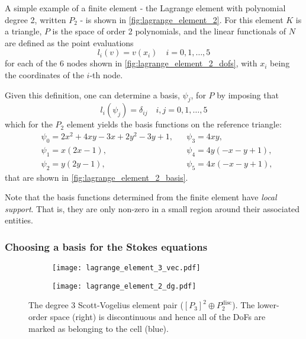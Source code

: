\documentclass[thesis]{subfiles}
\begin{document}
A simple example of a finite element - the Lagrange element with polynomial degree 2, written $P_2$ - is shown in \cref{fig:lagrange_element_2}.
For this element $K$ is a triangle, $P$ is the space of order 2 polynomials, and the linear functionals of $N$ are defined as the point evaluations
\begin{equation}
  l_i(v) = v(x_i)
  \quad
  i = 0,1,\dots,5
\end{equation}
for each of the 6 nodes shown in \cref{fig:lagrange_element_2_dofs}, with $x_i$ being the coordinates of the $i$-th node.

Given this definition, one can determine a basis, $\psi_j$, for $P$ by imposing that
\begin{equation}
  l_i(\psi_j) = \delta_{ij} \quad i, j = 0, 1, \dots, 5
\end{equation}
which for the $P_2$ element yields the basis functions on the reference triangle:
\begin{align*}
  &\psi_0 = 2x^2 + 4xy - 3x + 2y^2-3y+1,
  &
  &\psi_3 = 4xy, \\
  &\psi_1 = x(2x-1),
  &
  &\psi_4 = 4y(-x-y+1), \\
  &\psi_2 = y(2y-1),
  &
  &\psi_5 = 4x(-x-y+1),
\end{align*}
that are shown in \cref{fig:lagrange_element_2_basis}.

Note that the basis functions determined from the finite element have \emph{local support}.
That is, they are only non-zero in a small region around their associated entities.

\subsubsection{Choosing a basis for the Stokes equations}

\begin{figure}
  \centering
  \begin{subfigure}{.35\textwidth}
    \centering
    \texttt{[image: lagrange\_element\_3\_vec.pdf]}
    \label{fig:scott_vogelius_element_P3}
  \end{subfigure}
  \begin{subfigure}{.35\textwidth}
    \centering
    \texttt{[image: lagrange\_element\_2\_dg.pdf]}
  \end{subfigure}
  \caption{
    The degree 3 Scott-Vogelius element pair ($[P_3]^2 \oplus P_2^\mathrm{disc}$).
    The lower-order space (right) is discontinuous and hence all of the DoFs are marked as belonging to the cell (blue).
  }
  \label{fig:scott_vogelius_element}
\end{figure}
\end{document}
